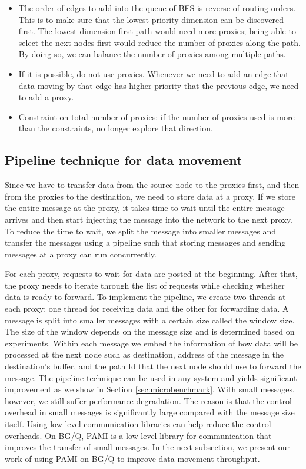 \documentclass[final,5p,times]{elsarticle}
\begin{document}
\begin{itemize}
\item The order of edges to add into the queue of BFS is reverse-of-routing orders. This is to make sure that the lowest-priority dimension can be discovered first. The lowest-dimension-first path would need more proxies; being able to select the next nodes first would reduce the number of proxies along the path. By doing so, we can balance the number of proxies among multiple paths.
\item If it is possible, do not use proxies. Whenever we need to add an edge that data moving by that edge has higher priority that the previous edge, we need to add a proxy.
\item Constraint on total number of proxies: if the number of proxies used is more than the constraints, no longer explore that direction.
\end{itemize}

\subsection{Pipeline technique for data movement}
Since we have to transfer data from the source node to the proxies first, and then from the proxies to the destination, we need to store data at a proxy. If we store the entire message at the proxy, it takes time to wait until the entire message arrives and  then start injecting the message into the network to the next proxy. To reduce the time to wait, we split the message into smaller messages and transfer the messages using a pipeline such that storing messages and sending messages at a proxy can run concurrently.

For each proxy, requests to wait for data are posted at the beginning. After that, the proxy needs to iterate through the list of requests while checking whether data is ready to forward. To implement the pipeline, we create two threads at each proxy: one thread for receiving data and the other for forwarding data. A message is split into smaller messages with a certain size called the window size. The size of the window depends on the message size and is determined based on experiments. Within each message we embed the information of how data will be processed at the next node such as destination, address of the message in the destination's buffer, and the path Id that the next node should use to forward the message. The pipeline technique can be used in any system and yields significant improvement as we show in Section \ref{sec:microbenchmark}. With small messages, however, we still suffer performance degradation. The reason is that the control overhead in small messages is significantly large compared with the message size itself. Using low-level communication libraries can help reduce the control overheads. On BG/Q, PAMI is a low-level library for communication that improves the transfer of small messages. In the next subsection, we present our work of using PAMI on BG/Q to improve data movement throughput.
\end{document}
